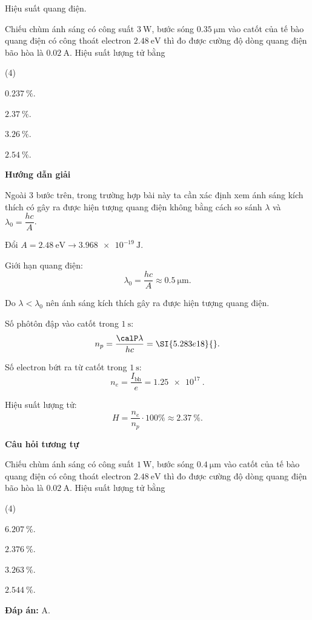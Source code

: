 \begin{dang}{Hiệu suất quang điện.}
	{
	Chiếu chùm ánh sáng có công suất $\SI{3}{\watt}$, bước sóng $\SI{0.35}{\micro \meter}$ vào catốt của tế bào quang điện có công thoát electron $\SI{2.48}{\electronvolt}$ thì đo được cường độ dòng quang điện bão hòa là $\SI{0.02}{\ampere}$. Hiệu suất lượng tử bằng
	\begin{mcq}(4)
		\item $\SI{0.237}{\percent}$.
		\item $\SI{2.37}{\percent}$.
		\item $\SI{3.26}{\percent}$.
		\item $\SI{2.54}{\percent}$.
	\end{mcq}}
{\begin{center}
	\textbf{Hướng dẫn giải}
\end{center}

	Ngoài 3 bước trên, trong trường hợp bài này ta cần xác định xem ánh sáng kích thích có gây ra được hiện tượng quang điện không bằng cách so sánh $\lambda$ và $\lambda_0=\dfrac{hc}{A}$.

	Đổi $A=\SI{2.48}{\electronvolt} \rightarrow \SI{3.968e-19}{\joule}$.
	
	Giới hạn quang điện:
	\begin{equation*}
		\lambda_0 = \dfrac{hc}{A} \approx \SI{0.5}{\micro \meter}.
	\end{equation*}
	
	Do $\lambda < \lambda_0$ nên ánh sáng kích thích gây ra được hiện tượng quang điện.
	
	Số phôtôn đập vào catốt trong $\SI{1}{\second}$:
	\begin{equation*}
		n_p=\dfrac{\calP \lambda}{hc}=\SI{5.283e18}{}.
	\end{equation*}
	
	Số electron bứt ra từ catốt trong $\SI{1}{\second}$:
	\begin{equation*}
		n_e=\dfrac{I_\text{bh}}{e}=\SI{1.25e17}{}.
	\end{equation*}
	
	Hiệu suất lượng tử:
	\begin{equation*}
		H=\dfrac{n_e}{n_p} \cdot 100 \% \approx \SI{2.37}{\percent}.
	\end{equation*}
	
	\begin{center}
	\textbf{Câu hỏi tương tự}
	\end{center}
	
Chiếu chùm ánh sáng có công suất $\SI{1}{\watt}$, bước sóng $\SI{0.4}{\micro \meter}$ vào catốt của tế bào quang điện có công thoát electron $\SI{2.48}{\electronvolt}$ thì đo được cường độ dòng quang điện bão hòa là $\SI{0.02}{\ampere}$. Hiệu suất lượng tử bằng
	\begin{mcq}(4)
		\item $\SI{6.207}{\percent}$.
		\item $\SI{2.376}{\percent}$.
		\item $\SI{3.263}{\percent}$.
		\item $\SI{2.544}{\percent}$.	
	\end{mcq}
	
	\textbf{Đáp án:} A.
	}

\end{dang}

